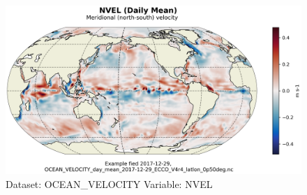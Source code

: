 \begin{figure}[H]
\centering
\includegraphics[scale=0.55]{../images/plots/latlon_plots/Ocean_Velocity/NVEL.png}
\caption{Dataset: OCEAN\_VELOCITY Variable: NVEL}
\label{tab:table-OCEAN_VELOCITY_NVEL-Plot}
\end{figure}
\pagebreak
